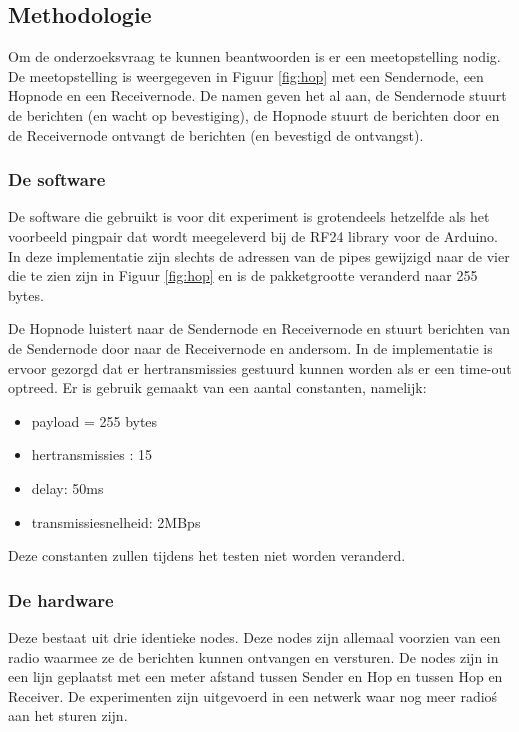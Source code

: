 \documentclass{article}
\begin{document}
\subsection{Methodologie}
Om de onderzoeksvraag te kunnen beantwoorden is er een meetopstelling nodig. De meetopstelling is weergegeven in Figuur \ref{fig:hop} met een Sendernode, een Hopnode en een Receivernode.
De namen geven het al aan, de Sendernode stuurt de berichten (en wacht op bevestiging), de Hopnode stuurt de berichten door en de Receivernode ontvangt de berichten (en bevestigd de ontvangst).  

\subsubsection{De software}

De software die gebruikt is voor dit experiment is grotendeels hetzelfde als het voorbeeld pingpair dat wordt meegeleverd bij de RF24 library voor de Arduino. In deze implementatie zijn slechts de adressen van de pipes gewijzigd naar de vier die te zien zijn in Figuur \ref{fig:hop} en is de pakketgrootte veranderd naar 255 bytes. 

De Hopnode luistert naar de Sendernode en Receivernode en stuurt berichten van de Sendernode door naar de Receivernode en andersom. In de implementatie is ervoor gezorgd dat er hertransmissies gestuurd kunnen worden als er een time-out optreed.
Er is gebruik gemaakt van een aantal constanten, namelijk:

\begin{itemize}
	\item payload = 255 bytes
	\item hertransmissies : 15
	\item delay: 50ms
	\item transmissiesnelheid: 2MBps
\end{itemize}  
Deze constanten zullen tijdens het testen niet worden veranderd.

\subsubsection{De hardware}

Deze bestaat uit drie identieke nodes. Deze nodes zijn allemaal voorzien van een radio waarmee ze de berichten kunnen ontvangen en versturen. De nodes zijn in een lijn geplaatst met een meter afstand tussen Sender en Hop en tussen Hop en Receiver. De experimenten zijn uitgevoerd in een netwerk waar nog meer radio\'s aan het sturen zijn.
 
\end{document}
